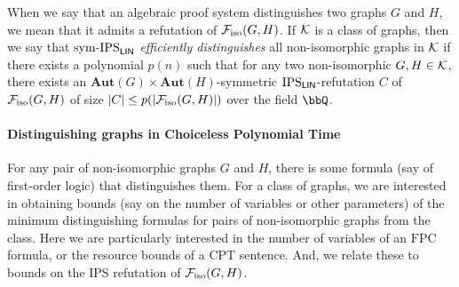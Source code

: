 \documentclass[10pt,a4paper]{article}
\newcommand{\FPC}{\mathrm{FPC}}
\newcommand{\Aut}{\mathbf{Aut}}
\newcommand{\Ff}{{\cal F}}
\newcommand{\Kk}{{\cal K}}
\newcommand{\Piso}{\Ff_{\text{iso}}}
\newcommand{\IPSlin}{\text{\upshape IPS}_{\mathsf{LIN}}}
\newcommand{\symIPSlin}{\text{ \upshape sym-IPS}_{\mathsf{LIN}}}
\begin{document}
When we say that an algebraic proof system distinguishes two graphs $G$ and $H$, we mean that it admits a refutation of $\Piso(G,H)$. 
If $\Kk$ is a class of graphs, then we say that$\symIPSlin$ \emph{efficiently distinguishes} all non-isomorphic graphs in $\Kk$ if there exists a polynomial $p(n)$ such that for any two non-isomorphic $G,H \in \Kk$, there exists an $\Aut(G) \times \Aut(H)$-symmetric $\IPSlin$-refutation $C$ of $\Piso(G,H)$ of size $|C| \leq p(|\Piso(G,H)|)$ over the field $\bbQ$.

\paragraph*{Distinguishing graphs in Choiceless Polynomial Time}
For any pair of non-isomorphic graphs $G$ and $H$, there is some formula (say of first-order logic) that distinguishes them.  For a class of graphs, we are interested in obtaining bounds (say on the number of variables or other parameters) of the minimum distinguishing formulas for pairs of non-isomorphic graphs from the class.  Here we are particularly interested in the number of variables of an $\FPC$ formula, or the resource bounds of a CPT sentence.  And, we relate these to bounds on the IPS refutation of $\Piso(G,H)$.
\end{document}
